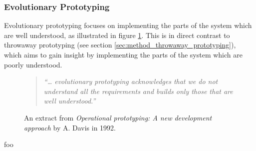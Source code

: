 
\subsubsection{Evolutionary Prototyping}

Evolutionary prototyping focuses on implementing the parts of the system which are well understood, as illustrated in figure \ref{fig:evolutionary_prototyping}. This is in direct contrast to throwaway prototyping (see section \ref{sec:method_throwaway_prototyping}), which aims to gain insight by implementing the parts of the system which are poorly understood.

\begin{figure}[htbp]
	\begin{quote}
		\textit{``… evolutionary prototyping acknowledges that we do not understand all the requirements and builds only those that are well understood.''} \cite{operational_prototyping}
	\end{quote}
	\caption{An extract from \textit{Operational prototyping: A new development approach} by A. Davis in 1992.}
	\label{fig:evolutionary_prototyping}
\end{figure}










foo
